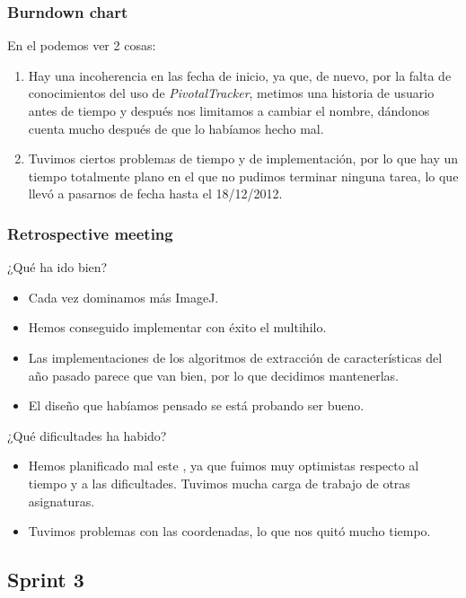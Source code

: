 \subsubsection*{Burndown chart}
En el \burndownchart{}  podemos ver 2 cosas:

\begin{enumerate}
\item Hay una incoherencia en las fecha de inicio, ya que, de nuevo, por la falta de conocimientos del uso de \textit{PivotalTracker}, metimos una historia de usuario antes de tiempo y después nos limitamos a cambiar el nombre, dándonos cuenta mucho después de que lo habíamos hecho mal.
\item Tuvimos ciertos problemas de tiempo y de implementación, por lo que hay un tiempo totalmente plano en el que no pudimos terminar ninguna tarea, lo que llevó a pasarnos de fecha hasta el 18/12/2012.
\end{enumerate}


\subsubsection*{Retrospective meeting}
¿Qué ha ido bien?
\begin{itemize}
 \item Cada vez dominamos más ImageJ.
 \item Hemos conseguido implementar con éxito el multihilo.
 \item Las implementaciones de los algoritmos de extracción de características del año pasado parece que van bien, por lo que decidimos mantenerlas.
 \item El diseño que habíamos pensado se está probando ser bueno.
\end{itemize}

¿Qué dificultades ha habido?
\begin{itemize}
 \item Hemos planificado mal este \sprint{}, ya que fuimos muy optimistas respecto al tiempo y a las dificultades. Tuvimos mucha carga de trabajo de otras asignaturas.
 \item Tuvimos problemas con las coordenadas, lo que nos quitó mucho tiempo.
\end{itemize}

\subsection{Sprint 3}
